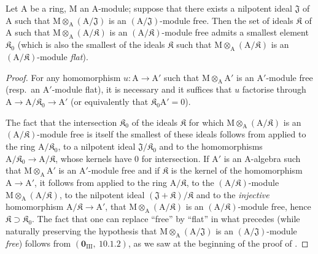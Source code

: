 \begin{corollary}[11.4.4]
\label{IV.11.4.4}
Let $\mathrm{A}$ be a ring, $\mathrm{M}$ an $\mathrm{A}$-module; suppose that there exists
a nilpotent ideal $\mathfrak{J}$ of $\mathrm{A}$ such that $\mathrm{M}\otimes_\mathrm{A}(\mathrm{A}/\mathfrak{J})$ is an $(\mathrm{A}/\mathfrak{J})$-module free. Then the set of
ideals $\mathfrak{K}$ of $\mathrm{A}$ such that $\mathrm{M}\otimes_\mathrm{A}(\mathrm{A}/\mathfrak{K})$ is an $(\mathrm{A}/\mathfrak{K})$-module free admits a smallest element $\mathfrak{K}_0$
(which is also the smallest of the ideals $\mathfrak{K}$ such that $\mathrm{M}\otimes_\mathrm{A}(\mathrm{A}/\mathfrak{K})$ is an $(\mathrm{A}/\mathfrak{K})$-module \emph{flat}).
\end{corollary}

\begin{proof}
For any homomorphism $u:\mathrm{A}\to\mathrm{A}'$ such that $\mathrm{M}\otimes_\mathrm{A}\mathrm{A}'$ is an $\mathrm{A}'$-module free (resp.\ an
$\mathrm{A}'$-module flat), it is necessary and it suffices that $u$ factorise through $\mathrm{A}\to\mathrm{A}/\mathfrak{K}_0\to\mathrm{A}'$ (or equivalently that $\mathfrak{K}_0\mathrm{A}'=0$).

The fact that the intersection $\mathfrak{K}_0$ of the ideals $\mathfrak{K}$ for which $\mathrm{M}\otimes_\mathrm{A}(\mathrm{A}/\mathfrak{K})$ is an
$(\mathrm{A}/\mathfrak{K})$-module free is itself the smallest of these ideals follows from  applied to the
ring $\mathrm{A}/\mathfrak{K}_0$, to a nilpotent ideal $\mathfrak{J}/\mathfrak{K}_0$ and to the homomorphisms $\mathrm{A}/\mathfrak{K}_0\to\mathrm{A}/\mathfrak{K}$,
whose kernels have $0$ for intersection. If $\mathrm{A}'$ is an $\mathrm{A}$-algebra such that $\mathrm{M}\otimes_\mathrm{A}\mathrm{A}'$ is an $\mathrm{A}'$-module free and if $\mathfrak{K}$ is the kernel
of the homomorphism $\mathrm{A}\to\mathrm{A}'$, it follows from  applied to the ring $\mathrm{A}/\mathfrak{K}$, to the
$(\mathrm{A}/\mathfrak{K})$-module $\mathrm{M}\otimes_\mathrm{A}(\mathrm{A}/\mathfrak{K})$, to the nilpotent ideal $(\mathfrak{J}+\mathfrak{K})/\mathfrak{K}$ and to the \emph{injective} homomorphism
$\mathrm{A}/\mathfrak{K}\to\mathrm{A}'$, that $\mathrm{M}\otimes_\mathrm{A}(\mathrm{A}/\mathfrak{K})$ is an $(\mathrm{A}/\mathfrak{K})$-module free, hence $\mathfrak{K}\supset\mathfrak{K}_0$. The fact that
one can replace ``free'' by ``flat'' in what precedes (while naturally preserving
the hypothesis that $\mathrm{M}\otimes_\mathrm{A}(\mathrm{A}/\mathfrak{J})$ is an $(\mathrm{A}/\mathfrak{J})$-module \emph{free}) follows from $(\mathbf{0}_{\mathrm{III}},~10.1.2)$,
as we saw at the beginning of the proof of .
\end{proof}

